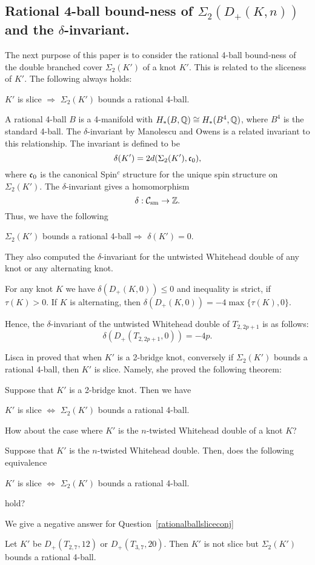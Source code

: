 \documentclass[11pt]{amsart}
\begin{document}
\subsection{Rational 4-ball bound-ness of $\Sigma_2(D_+(K,n))$ and the $\delta$-invariant.}
The next purpose of this paper is to consider the rational 4-ball bound-ness of the double branched cover $\Sigma_2(K')$ of a knot $K'$.
This is related to the sliceness of $K'$.
The following always holds:
\begin{center}
$K'$ is slice $\Rightarrow$ $\Sigma_2(K')$ bounds a rational 4-ball.
\end{center}
A rational 4-ball $B$ is a 4-manifold with $H_\ast(B,{\Bbb Q})\cong H_\ast(B^4,{\Bbb Q})$, where $B^4$ is 
the standard 4-ball.
The $\delta$-invariant by Manolescu and Owens is a related invariant to this relationship.
The invariant is defined to be
$$\delta(K')=2d(\Sigma_2(K'),\frak{c}_0),$$
where $\frak{c}_0$ is the canonical Spin$^c$ structure for the unique spin structure on $\Sigma_2(K')$.
The $\delta$-invariant gives a homomorphism
$$\delta:{\mathcal C}_{\text{sm}}\to {\Bbb Z}.$$
Thus, we have the following
\begin{center}$\Sigma_2(K')$ bounds a rational 4-ball$\Rightarrow$ $\delta(K')=0$.\end{center}

They also computed the $\delta$-invariant for the untwisted Whitehead double of any knot or any alternating knot.
\begin{thm}[\cite{MO}]
For any knot $K$ we have $\delta(D_+(K,0))\le 0$ and inequality is strict, if $\tau(K)>0$.
If $K$ is alternating, then $\delta(D_+(K,0))=-4\max\{\tau(K),0\}$.
\end{thm}
Hence, the $\delta$-invariant of the untwisted Whitehead double of $T_{2,2p+1}$ is as follows:
$$\delta(D_+(T_{2,2p+1},0))=-4p.$$

Lisca in \cite{Li} proved that when $K'$ is a 2-bridge knot, conversely if $\Sigma_2(K')$ bounds a rational 4-ball,
then $K'$ is slice.
Namely, she proved the following theorem:
\begin{thm}[\cite{Li}]
Suppose that $K'$ is a 2-bridge knot.
Then we have
\begin{center}
$K'$ is slice $\Leftrightarrow$ $\Sigma_2(K')$ bounds a rational 4-ball.
\end{center}
\end{thm}
How about the case where $K'$ is the $n$-twisted Whitehead double of a knot $K$?
\begin{que}
\label{rationalballsliceconj}
Suppose that $K'$ is the $n$-twisted Whitehead double.
Then, does the following equivalence
\begin{center}$K'$ is slice $\Leftrightarrow$ $\Sigma_2(K')$ bounds a rational 4-ball.\end{center}
hold?
\end{que}
We give a negative answer for Question~\ref{rationalballsliceconj}
\begin{thm}
\label{2712}
Let $K'$ be $D_+(T_{2,7},12)$ or $D_+(T_{3,7},20)$.
Then $K'$ is not slice but $\Sigma_2(K')$ bounds a rational 4-ball.
\end{thm}
\end{document}

